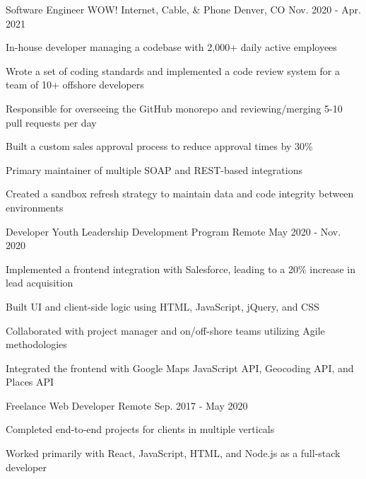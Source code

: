\begin{cventries}
  \cventry
    {Software Engineer} %
    {WOW! Internet, Cable, \& Phone} %
    {Denver, CO} %
    {Nov. 2020 - Apr. 2021} %
    {
      \begin{cvitems} %
        \item {In-house developer managing a codebase with 2,000+ daily active employees}
        \item {Wrote a set of coding standards and implemented a code review system for a team of 10+ offshore developers}
        \item {Responsible for overseeing the GitHub monorepo and reviewing/merging 5-10 pull requests per day}
        \item {Built a custom sales approval process to reduce approval times by 30\%}
        \item {Primary maintainer of multiple SOAP and REST-based integrations}
        \item {Created a sandbox refresh strategy to maintain data and code integrity between environments}
      \end{cvitems}
    }

  \cventry
    {Developer} %
    {Youth Leadership Development Program} %
    {Remote} %
    {May 2020 - Nov. 2020} %
    {
      \begin{cvitems} %
        \item {Implemented a frontend integration with Salesforce, leading to a 20\% increase in lead acquisition}
        \item {Built UI and client-side logic using HTML, JavaScript, jQuery, and CSS}
        \item {Collaborated with project manager and on/off-shore teams utilizing Agile methodologies}
        \item {Integrated the frontend with Google Maps JavaScript API, Geocoding API, and Places API}
      \end{cvitems}
    }

  \cventry
    {Freelance} %
    {Web Developer} %
    {Remote} %
    {Sep. 2017 - May 2020} %
    {
      \begin{cvitems} %
        \item {Completed end-to-end projects for clients in multiple verticals}
        \item {Worked primarily with React, JavaScript, HTML, and Node.js as a full-stack developer}
      \end{cvitems}
    }

\end{cventries}
